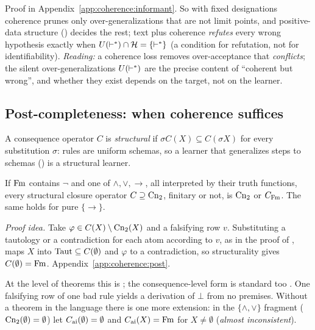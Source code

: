 Proof in Appendix~\ref{app:coherence:informant}. So with fixed designations coherence prunes only over-generalizations that are not limit points, and positive-data structure () decides the rest; text plus coherence \emph{refutes} every wrong hypothesis exactly when $U(\vdash^{*})\cap\mathcal{H}=\{\vdash^{*}\}$ (a condition for refutation, not for identifiability). \emph{Reading:} a coherence loss removes over-acceptance that \emph{conflicts}; the silent over-generalizations $U(\vdash^{*})$ are the precise content of ``coherent but wrong'', and whether they exist depends on the target, not on the learner.

\subsection{Post-completeness: when coherence suffices}\label{sec:coherence:post}

A consequence operator $C$ is \emph{structural} if $\sigma C(X)\subseteq C(\sigma X)$ for every substitution $\sigma$: rules are uniform schemas, so a learner that generalizes steps to schemas () is a structural learner.

\begin{theorem}\label{thm:coherence:post}
If $\mathrm{Fm}$ contains $\neg$ and one of $\wedge,\vee,\to$, all interpreted by their truth functions, every structural closure operator $C\supseteq\mathrm{Cn}_2$, finitary or not, is $\mathrm{Cn}_2$ or $C_{\mathrm{Fm}}$. The same holds for pure $\{\to\}$. \hfill{}\ \ 
\end{theorem}

\noindent\emph{Proof idea.} Take $\varphi\in C(X)\setminus\mathrm{Cn}_2(X)$ and a falsifying row $v$. Substituting a tautology or a contradiction for each atom according to $v$, as in the proof of , maps $X$ into $\mathrm{Taut}\subseteq C(\emptyset)$ and $\varphi$ to a contradiction, so structurality gives $C(\emptyset)=\mathrm{Fm}$. Appendix~\ref{app:coherence:post}.

At the level of theorems this is \citet{post1921}; the consequence-level form is standard too \citep{pogorzelski1971structural,wojcicki1988theory,pogorzelski2008completeness}. One falsifying row of one bad rule yields a derivation of $\bot$ from no premises. Without a theorem in the language there is one more extension: in the $\{\wedge,\vee\}$ fragment ($\mathrm{Cn}_2(\emptyset)=\emptyset$) let $C_{\mathrm{ai}}(\emptyset)=\emptyset$ and $C_{\mathrm{ai}}(X)=\mathrm{Fm}$ for $X\neq\emptyset$ (\emph{almost inconsistent}).

